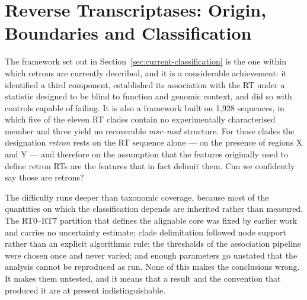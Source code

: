 

\chapter{Reverse Transcriptases: Origin, Boundaries and Classification}
\label{chapter3}
\thispagestyle{empty}



The framework set out in Section~\ref{sec:current-classification} is the one within which
retrons are currently described, and it is a considerable achievement: it identified a third
component, established its association with the RT under a statistic designed to be blind to
function and genomic context, and did so with controls capable of failing. It is also a
framework built on 1{,}928 sequences, in which five of the eleven RT clades contain no
experimentally characterised member and three yield no recoverable \textit{msr}--\textit{msd}
structure. For those clades the designation \emph{retron} rests on the RT sequence alone ---
on the presence of regions X and Y --- and therefore on the assumption that the features
originally used to define retron RTs are the features that in fact delimit them. Can we
confidently say those are retrons?

The difficulty runs deeper than taxonomic coverage, because most of the quantities on which
the classification depends are inherited rather than measured. The RT0--RT7 partition that
defines the alignable core was fixed by earlier work and carries no uncertainty estimate;
clade delimitation followed node support rather than an explicit algorithmic rule; the
thresholds of the association pipeline were chosen once and never varied; and enough
parameters go unstated that the analysis cannot be reproduced as run. None of this makes the
conclusions wrong. It makes them untested, and it means that a result and the convention that
produced it are at present indistinguishable.



